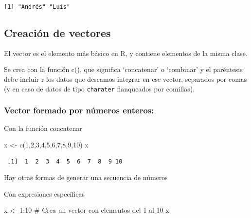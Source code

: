 \documentclass[
  letterpaper,
]{scrbook}
\newenvironment{Shaded}{\begin{snugshade}}{\end{snugshade}}
\newcommand{\CommentTok}[1]{\textcolor[rgb]{0.37,0.37,0.37}{#1}}
\newcommand{\DecValTok}[1]{\textcolor[rgb]{0.68,0.00,0.00}{#1}}
\newcommand{\FunctionTok}[1]{\textcolor[rgb]{0.28,0.35,0.67}{#1}}
\newcommand{\NormalTok}[1]{\textcolor[rgb]{0.00,0.23,0.31}{#1}}
\newcommand{\OtherTok}[1]{\textcolor[rgb]{0.00,0.23,0.31}{#1}}
\newcommand{\SpecialCharTok}[1]{\textcolor[rgb]{0.37,0.37,0.37}{#1}}
\begin{document}
\begin{verbatim}
[1] "Andrés" "Luis"  
\end{verbatim}

\hypertarget{creaciuxf3n-de-vectores}{%
\subsection{\texorpdfstring{\textbf{Creación de
vectores}}{Creación de vectores}}\label{creaciuxf3n-de-vectores}}

El vector es el elemento más básico en R, y contiene elementos de la
misma clase.

Se crea con la función c(), que significa `concatenar' o `combinar' y el
paréntesis debe incluir r los datos que deseamos integrar en ese vector,
separados por comas (y en caso de datos de tipo \texttt{charater}
flanqueados por comillas).

\hypertarget{vector-formado-por-nuxfameros-enteros}{%
\subsubsection{Vector formado por números
enteros:}\label{vector-formado-por-nuxfameros-enteros}}

Con la función concatenar

\begin{Shaded}
\begin{Highlighting}[]
\NormalTok{x }\OtherTok{\textless{}{-}} \FunctionTok{c}\NormalTok{(}\DecValTok{1}\NormalTok{,}\DecValTok{2}\NormalTok{,}\DecValTok{3}\NormalTok{,}\DecValTok{4}\NormalTok{,}\DecValTok{5}\NormalTok{,}\DecValTok{6}\NormalTok{,}\DecValTok{7}\NormalTok{,}\DecValTok{8}\NormalTok{,}\DecValTok{9}\NormalTok{,}\DecValTok{10}\NormalTok{)}
\NormalTok{x}
\end{Highlighting}
\end{Shaded}

\begin{verbatim}
 [1]  1  2  3  4  5  6  7  8  9 10
\end{verbatim}

Hay otras formas de generar una secuencia de números

Con expresiones específicas

\begin{Shaded}
\begin{Highlighting}[]
\NormalTok{x }\OtherTok{\textless{}{-}} \DecValTok{1}\SpecialCharTok{:}\DecValTok{10}
\CommentTok{\# Crea un vector con elementos del 1 al 10}
\NormalTok{x}
\end{Highlighting}
\end{Shaded}
\end{document}
